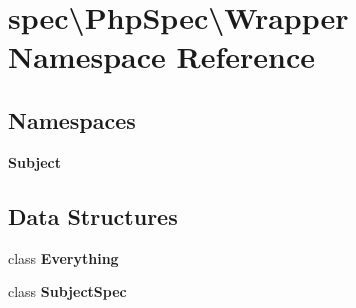\section{spec\textbackslash{}Php\+Spec\textbackslash{}Wrapper Namespace Reference}
\label{namespacespec_1_1_php_spec_1_1_wrapper}
\subsection*{Namespaces}
\begin{DoxyCompactItemize}
\item 
 {\bf Subject}
\end{DoxyCompactItemize}
\subsection*{Data Structures}
\begin{DoxyCompactItemize}
\item 
class {\bf Everything}
\item 
class {\bf Subject\+Spec}
\end{DoxyCompactItemize}
